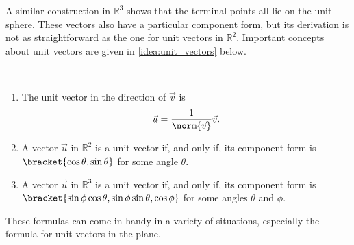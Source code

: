 A similar construction in $\mathbb{R}^3$ shows that the terminal points all lie on the unit sphere. These vectors also have a particular component form, but its derivation is not as straightforward as the one for unit vectors in $\mathbb{R}^2$. Important concepts about unit vectors are given in \autoref{idea:unit_vectors} below.

\begin{keyidea}\label{idea:unit_vectors}
%
\mbox{}\\[-2\baselineskip]\begin{enumerate}
	\item	The unit vector in the direction of $\vec v$ is
	\[\vec u = \frac1{\norm{\vec v}} \vec v.\]
	\item	A vector $\vec u$ in $\mathbb{R}^2$ is a unit vector if, and only if, its component form is $\bracket{\cos\theta,\sin\theta}$ for some angle $\theta$.
	\item	A vector $\vec u$ in $\mathbb{R}^3$ is a unit vector if, and only if, its component form is $\bracket{\sin\phi\cos\theta,\sin\phi\sin\theta,\cos\phi}$ for some angles $\theta$ and $\phi$.
\end{enumerate}
\end{keyidea}

These formulas can come in handy in a variety of situations, especially the formula for unit vectors in the plane.


